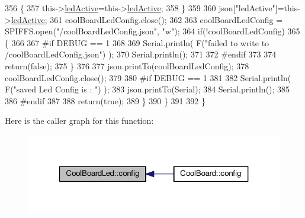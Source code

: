 \begin{DoxyCode}
356             \{
357                 this->\hyperlink{classCoolBoardLed_a5f17c135516fcf4b44ea8a096ba0177a}{ledActive}=this->\hyperlink{classCoolBoardLed_a5f17c135516fcf4b44ea8a096ba0177a}{ledActive};          
358             \}
359             
360             json[\textcolor{stringliteral}{"ledActive"}]=this->\hyperlink{classCoolBoardLed_a5f17c135516fcf4b44ea8a096ba0177a}{ledActive};
361             coolBoardLedConfig.close();
362             
363             coolBoardLedConfig = SPIFFS.open(\textcolor{stringliteral}{"/coolBoardLedConfig.json"}, \textcolor{stringliteral}{"w"});
364             \textcolor{keywordflow}{if}(!coolBoardLedConfig)
365             \{
366             
367 \textcolor{preprocessor}{            #if DEBUG == 1 }
368 
369                 Serial.println( F(\textcolor{stringliteral}{"failed to write to /coolBoardLedConfig.json"}) );
370                 Serial.println();
371 
372 \textcolor{preprocessor}{            #endif}
373 
374                 \textcolor{keywordflow}{return}(\textcolor{keyword}{false});          
375             \}
376 
377             json.printTo(coolBoardLedConfig);
378             coolBoardLedConfig.close();
379 
380 \textcolor{preprocessor}{        #if DEBUG == 1}
381     
382             Serial.println( F(\textcolor{stringliteral}{"saved Led Config is : "}) );
383             json.printTo(Serial);
384             Serial.println();
385 
386 \textcolor{preprocessor}{        #endif}
387 
388             \textcolor{keywordflow}{return}(\textcolor{keyword}{true}); 
389         \}
390     \}   
391 
392 \}               
\end{DoxyCode}
Here is the caller graph for this function\+:\nopagebreak
\begin{figure}[H]
\begin{center}
\leavevmode
\includegraphics[width=321pt]{classCoolBoardLed_a1b60e5e30bea96c49ed62ed1bf1ffc8b_icgraph}
\end{center}
\end{figure}
\mbox{\label{classCoolBoardLed_a69f323359e0c9f797422f2152b5d41ef}} 
